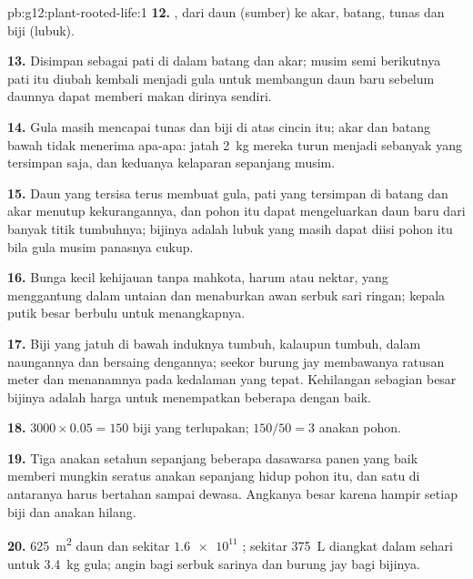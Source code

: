 \begin{solution}{pb:g12:plant-rooted-life:1}
\textbf{12.} , dari daun (sumber) ke akar, batang, tunas dan biji
(lubuk).

\textbf{13.} Disimpan sebagai pati di dalam batang dan akar; musim semi
berikutnya pati itu diubah kembali menjadi gula untuk membangun daun
baru sebelum daunnya dapat memberi makan dirinya sendiri.

\textbf{14.} Gula masih mencapai tunas dan biji di atas cincin itu;
akar dan batang bawah tidak menerima apa-apa: jatah \qty{2}{kg} mereka
turun menjadi sebanyak yang tersimpan saja, dan keduanya kelaparan
sepanjang musim.

\textbf{15.} Daun yang tersisa terus membuat gula, pati yang tersimpan
di batang dan akar menutup kekurangannya, dan pohon itu dapat
mengeluarkan daun baru dari banyak titik tumbuhnya; bijinya adalah
lubuk yang masih dapat diisi pohon itu bila gula musim panasnya cukup.

\textbf{16.} Bunga kecil kehijauan tanpa mahkota, harum atau nektar,
yang menggantung dalam untaian dan menaburkan awan serbuk sari ringan;
kepala putik besar berbulu untuk menangkapnya.

\textbf{17.} Biji yang jatuh di bawah induknya tumbuh, kalaupun
tumbuh, dalam naungannya dan bersaing dengannya; seekor burung jay
membawanya ratusan meter dan menanamnya pada kedalaman yang tepat.
Kehilangan sebagian besar bijinya adalah harga untuk menempatkan
beberapa dengan baik.

\textbf{18.} $3000 \times 0.05 = 150$ biji yang terlupakan; $150/50 = 3$
anakan pohon.

\textbf{19.} Tiga anakan setahun sepanjang beberapa dasawarsa panen
yang baik memberi mungkin seratus anakan sepanjang hidup pohon itu,
dan satu di antaranya harus bertahan sampai dewasa. Angkanya besar
karena hampir setiap biji dan anakan hilang.

\textbf{20.} \qty{625}{m^2} daun dan sekitar $\num{1.6e11}$ ;
sekitar \qty{375}{L} diangkat dalam sehari untuk \qty{3.4}{kg} gula;
angin bagi serbuk sarinya dan burung jay bagi bijinya.
\end{solution}

